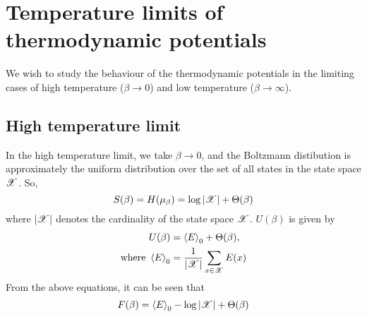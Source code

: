 \documentclass[letterpaper,english,10pt]{article}
\begin{document}
\section{Temperature limits of thermodynamic potentials}
We wish to study the behaviour of the thermodynamic potentials in the limiting cases of high temperature ($\beta \rightarrow 0$) and low temperature ($\beta \rightarrow \infty$).
\subsection{High temperature limit}
In the high temperature limit, we take $\beta \rightarrow 0$, and the Boltzmann distibution is approximately the uniform distribution over the set of all states in the state space $\mathscr{X}$. So,
\begin{equation}
S(\beta) = H(\mu_\beta) = \log |\mathscr{X}| + \Theta(\beta)\\
\end{equation}
where $|\mathscr{X}|$ denotes the cardinality of the state space $\mathscr{X}$. $U(\beta)$ is given by
\begin{align}
U(\beta) &= \left\langle E \right\rangle_0 + \Theta(\beta),\\
\text{where } \left\langle E \right\rangle_0 &= \frac{1}{|\mathscr{X}|} \sum_{x \in \mathscr{X}} E(x)
\end{align}
From the above equations, it can be seen that
\begin{equation}
F(\beta) = \left\langle E \right\rangle_0 - \log |\mathscr{X}| + \Theta(\beta)
\end{equation}
\end{document}
